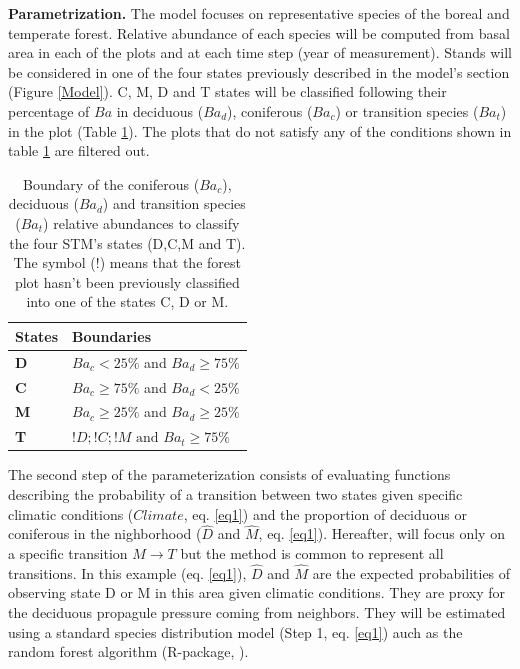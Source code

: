 \textbf{Parametrization.} The model focuses on representative species of the
boreal and temperate forest. Relative  abundance of each species will be
computed from basal area in each of the plots and at each time step (year of
measurement). Stands will be considered in one of the four states previously
described in the model's section (Figure \ref{Model}). C, M, D and T states
will be classified following their percentage of $Ba$ in deciduous ($Ba_d$),
coniferous ($Ba_c$) or transition species ($Ba_t$) in the plot (Table
\ref{bound}). The plots that do not satisfy any of the conditions shown in
table \ref{bound} are filtered out.\\

\begin{table}[h]
\centering
\caption{Boundary of the coniferous ($Ba_c$), deciduous ($Ba_d$) and transition species ($Ba_t$) relative abundances to classify the four STM's states (D,C,M and T). The symbol ($!$) means that the forest plot hasn't been previously classified into one of the states C, D or M.}
\begin{tabular}{ll}
	States  & Boundaries                            \\
	\hline
	\textbf{D} & $Ba_c< 25\%$ and $Ba_d \geq 75\%$    \\
	\textbf{C} & $Ba_c \geq 75\%$ and $Ba_d < 25\%$    \\
	\textbf{M} & $Ba_c \geq 25\%$ and $Ba_d \geq 25\%$ \\
	\textbf{T} & $!D;!C;!M \text{ and }  Ba_t  \geq 75\%$                                
\end{tabular}

\label{bound}
\end{table}

The second step of the parameterization consists of evaluating functions
describing the probability of a transition between two states given specific
climatic conditions ($Climate$, eq. \ref{eq1}) and the proportion of deciduous
or coniferous in the nighborhood ($\hat{D}$ and $\hat{M}$, eq. \ref{eq1}).
Hereafter, will focus only on a specific transition $M \rightarrow T$ but the
method is common to represent  all transitions. In this example (eq.
\ref{eq1}),  $\hat{D}$ and $\hat{M}$ are the expected probabilities of
observing state D or M in this area given climatic conditions. They are proxy
for the deciduous propagule pressure coming from neighbors. They will be
estimated using  a standard species distribution model (Step 1, eq. \ref{eq1})
auch as the random forest algorithm (R-package, \cite{Liaw2002a}).

